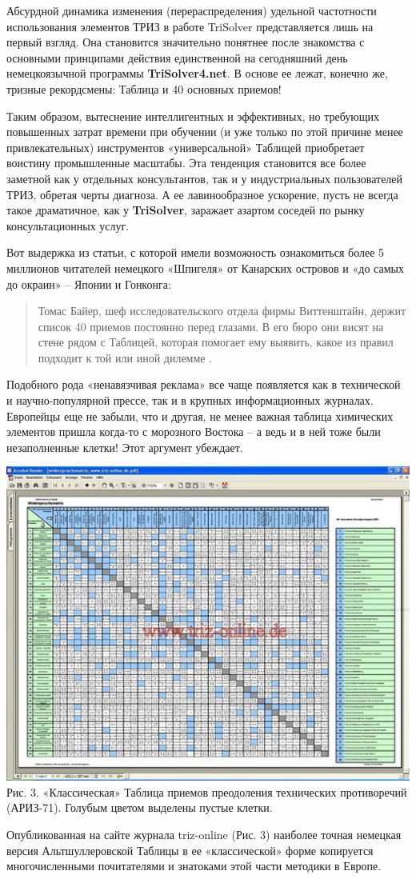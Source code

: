 \documentclass[11pt,a4paper]{article}
\begin{document}
Абсурдной динамика изменения (перераспределения) удельной частотности
использования элементов ТРИЗ в работе TriSolver представляется лишь на первый
взгляд. Она становится значительно понятнее после знакомства с основными
принципами действия единственной на сегодняшний день немецкоязычной программы
\textbf{TriSolver4.net}. В основе ее лежат, конечно же, тризные рекордсмены:
Таблица и 40 основных приемов!

Таким образом, вытеснение интеллигентных и эффективных, но требующих
повышенных затрат времени при обучении (и уже только по этой причине менее
привлекательных) инструментов «универсальной» Таблицей приобретает воистину
промышленные масштабы. Эта тенденция становится все более заметной как у
отдельных консультантов, так и у индустриальных пользователей ТРИЗ, обретая
черты диагноза. А ее лавинообразное ускорение, пусть не всегда такое
драматичное, как у \textbf{TriSolver}, заражает азартом соседей по рынку
консультационных услуг.

Вот выдержка из статьи, с которой имели возможность ознакомиться более 5
миллионов читателей немецкого «Шпигеля» от Канарских островов и «до самых до
окраин» -- Японии и Гонконга:
\begin{quote}
  Томас Байер, шеф исследовательского отдела фирмы Виттенштайн, держит список
  40 приемов постоянно перед глазами. В его бюро они висят на стене рядом с
  Таблицей, которая помогает ему выявить, какое из правил подходит к той или
  иной дилемме \cite{Dworschak2005}.
\end{quote}
Подобного рода «ненавязчивая реклама» все чаще появляется как в технической и
научно-популярной прессе, так и в крупных информационных журналах. Европейцы
еще не забыли, что и другая, не менее важная таблица химических элементов
пришла когда-то с морозного Востока -- а ведь и в ней тоже были незаполненные
клетки! Этот аргумент убеждает.

\begin{center}
  \includegraphics[width=.8\textwidth]{./4.jpg} \\
  Рис. 3. «Классическая» Таблица приемов преодоления технических противоречий
  (АРИЗ-71). Голубым цветом выделены пустые клетки.
\end{center}
Опубликованная на сайте журнала triz-online (Рис. 3) наиболее точная немецкая
версия Альтшуллеровской Таблицы в ее «классической» форме копируется
многочисленными почитателями и знатоками этой части методики в Европе.
\end{document}
